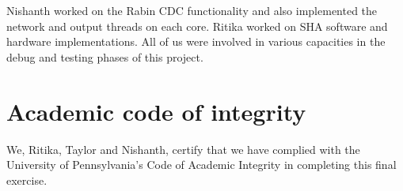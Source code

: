 \documentclass{article}
\begin{document}
\par
Nishanth worked on the Rabin CDC functionality and also implemented the network and output threads on each core.
Ritika worked on SHA software and hardware implementations.
\newline\newline
All of us were involved in various capacities in the debug and testing phases of this project.  
 
\section{Academic code of integrity}
We, Ritika, Taylor and Nishanth, certify that we have complied with the University of Pennsylvania’s Code of Academic Integrity in completing this final exercise.
\end{document}
